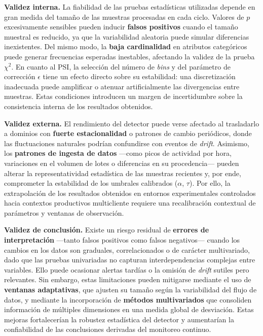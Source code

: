 \textbf{Validez interna.}  
La fiabilidad de las pruebas estadísticas utilizadas depende en gran medida del tamaño de las muestras procesadas en cada ciclo.  
Valores de \(p\) excesivamente sensibles pueden inducir \textbf{falsos positivos} cuando el tamaño muestral es reducido, ya que la variabilidad aleatoria puede simular diferencias inexistentes.  
Del mismo modo, la \textbf{baja cardinalidad} en atributos categóricos puede generar frecuencias esperadas inestables, afectando la validez de la prueba \(\chi^2\).  
En cuanto al PSI, la selección del número de \textit{bins} y del parámetro de corrección \(\epsilon\) tiene un efecto directo sobre su estabilidad: una discretización inadecuada puede amplificar o atenuar artificialmente las divergencias entre muestras.  
Estas condiciones introducen un margen de incertidumbre sobre la consistencia interna de los resultados obtenidos.

\textbf{Validez externa.}  
El rendimiento del detector puede verse afectado al trasladarlo a dominios con \textbf{fuerte estacionalidad} o patrones de cambio periódicos, donde las fluctuaciones naturales podrían confundirse con eventos de \textit{drift}.  
Asimismo, los \textbf{patrones de ingesta de datos} —como picos de actividad por hora, variaciones en el volumen de lotes o diferencias en su procedencia— pueden alterar la representatividad estadística de las muestras recientes y, por ende, comprometer la estabilidad de los umbrales calibrados (\(\alpha\), \(\tau\)).  
Por ello, la extrapolación de los resultados obtenidos en entornos experimentales controlados hacia contextos productivos multicliente requiere una recalibración contextual de parámetros y ventanas de observación.

\textbf{Validez de conclusión.}  
Existe un riesgo residual de \textbf{errores de interpretación} —tanto falsos positivos como falsos negativos— cuando los cambios en los datos son graduales, correlacionados o de carácter multivariado, dado que las pruebas univariadas no capturan interdependencias complejas entre variables.  
Ello puede ocasionar alertas tardías o la omisión de \textit{drift} sutiles pero relevantes.  
Sin embargo, estas limitaciones pueden mitigarse mediante el uso de \textbf{ventanas adaptativas}, que ajusten su tamaño según la variabilidad del flujo de datos, y mediante la incorporación de \textbf{métodos multivariados} que consoliden información de múltiples dimensiones en una medida global de desviación.  
Estas mejoras fortalecerían la robustez estadística del detector y aumentarían la confiabilidad de las conclusiones derivadas del monitoreo continuo.


